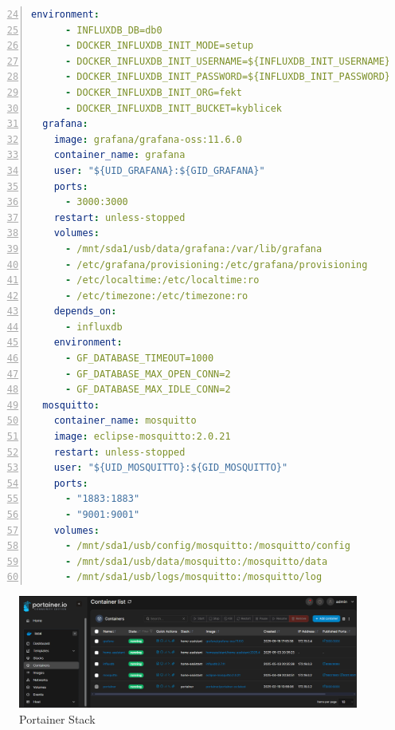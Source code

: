 \begin{lstlisting}[language=YAML, breaklines=true, numbers=left, firstnumber=24, numberstyle=\small, numbersep=10pt, frame=single, basicstyle=\ttfamily\small]
    environment:
      - INFLUXDB_DB=db0
      - DOCKER_INFLUXDB_INIT_MODE=setup
      - DOCKER_INFLUXDB_INIT_USERNAME=${INFLUXDB_INIT_USERNAME}
      - DOCKER_INFLUXDB_INIT_PASSWORD=${INFLUXDB_INIT_PASSWORD}
      - DOCKER_INFLUXDB_INIT_ORG=fekt
      - DOCKER_INFLUXDB_INIT_BUCKET=kyblicek
  grafana:
    image: grafana/grafana-oss:11.6.0
    container_name: grafana
    user: "${UID_GRAFANA}:${GID_GRAFANA}"
    ports:
      - 3000:3000
    restart: unless-stopped
    volumes:
      - /mnt/sda1/usb/data/grafana:/var/lib/grafana
      - /etc/grafana/provisioning:/etc/grafana/provisioning
      - /etc/localtime:/etc/localtime:ro
      - /etc/timezone:/etc/timezone:ro
    depends_on:
      - influxdb
    environment:
      - GF_DATABASE_TIMEOUT=1000
      - GF_DATABASE_MAX_OPEN_CONN=2
      - GF_DATABASE_MAX_IDLE_CONN=2
  mosquitto:
    container_name: mosquitto
    image: eclipse-mosquitto:2.0.21
    restart: unless-stopped
    user: "${UID_MOSQUITTO}:${GID_MOSQUITTO}"
    ports:
      - "1883:1883"
      - "9001:9001"
    volumes:
      - /mnt/sda1/usb/config/mosquitto:/mosquitto/config
      - /mnt/sda1/usb/data/mosquitto:/mosquitto/data
      - /mnt/sda1/usb/logs/mosquitto:/mosquitto/log
\end{lstlisting}
\begin{figure}[!ht]
  \begin{center}
  \includegraphics[scale=0.42]{obrazky/portainer.png}
  \end{center}
  \caption[Portainer Stack]{Portainer Stack}
  \label{fig:portainer}
\end{figure}

